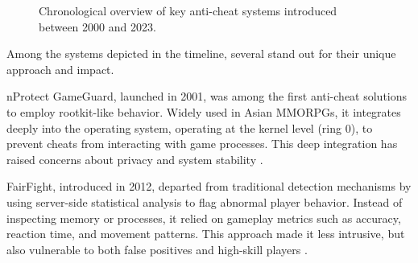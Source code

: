 \begin{figure}[h!]
    \centering
    \caption{Chronological overview of key anti-cheat systems introduced between 2000 and 2023.}
    \label{fig:timeline-anticheat-balanced}
\end{figure}

Among the systems depicted in the timeline, several stand out for their unique approach and impact.

nProtect GameGuard, launched in 2001, was among the first anti-cheat solutions to employ rootkit-like behavior. Widely used in Asian MMORPGs, it integrates deeply into the operating system, operating at the kernel level (ring 0), to prevent cheats from interacting with game processes. This deep integration has raised concerns about privacy and system stability \parencite{nprotect_wikipedia}.

FairFight, introduced in 2012, departed from traditional detection mechanisms by using server-side statistical analysis to flag abnormal player behavior. Instead of inspecting memory or processes, it relied on gameplay metrics such as accuracy, reaction time, and movement patterns. This approach made it less intrusive, but also vulnerable to both false positives and high-skill players \parencite{fairfight_website}.

